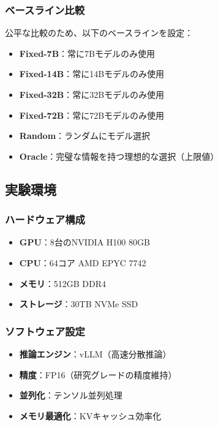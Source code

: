 \documentclass[a4paper,12pt]{jsarticle}
\begin{document}
\subsubsection{ベースライン比較}

公平な比較のため、以下のベースラインを設定：

\begin{itemize}
\item \textbf{Fixed-7B}：常に7Bモデルのみ使用
\item \textbf{Fixed-14B}：常に14Bモデルのみ使用
\item \textbf{Fixed-32B}：常に32Bモデルのみ使用
\item \textbf{Fixed-72B}：常に72Bモデルのみ使用
\item \textbf{Random}：ランダムにモデル選択
\item \textbf{Oracle}：完璧な情報を持つ理想的な選択（上限値）
\end{itemize}

\subsection{実験環境}

\subsubsection{ハードウェア構成}

\begin{itemize}
\item \textbf{GPU}：8台のNVIDIA H100 80GB
\item \textbf{CPU}：64コア AMD EPYC 7742
\item \textbf{メモリ}：512GB DDR4
\item \textbf{ストレージ}：30TB NVMe SSD
\end{itemize}

\subsubsection{ソフトウェア設定}

\begin{itemize}
\item \textbf{推論エンジン}：vLLM（高速分散推論）
\item \textbf{精度}：FP16（研究グレードの精度維持）
\item \textbf{並列化}：テンソル並列処理
\item \textbf{メモリ最適化}：KVキャッシュ効率化
\end{itemize}
\end{document}
